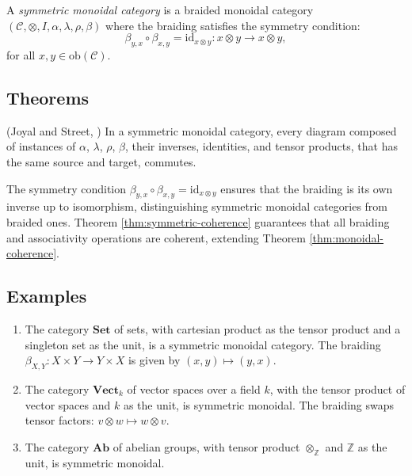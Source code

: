 \documentclass{article}
\begin{document}
\begin{definition}
A \emph{symmetric monoidal category} is a braided monoidal category $(\mathcal{C}, \otimes, I, \alpha, \lambda, \rho, \beta)$ where the braiding satisfies the symmetry condition:
\[
\beta_{y,x} \circ \beta_{x,y} = \mathrm{id}_{x \otimes y} : x \otimes y \to x \otimes y,
\]
for all $x, y \in \mathrm{ob}(\mathcal{C})$.
\end{definition}

\subsection{Theorems}

\begin{theorem}
\label{thm:symmetric-coherence}
(Joyal and Street, \cite{JoyalStreet91}) In a symmetric monoidal category, every diagram composed of instances of $\alpha$, $\lambda$, $\rho$, $\beta$, their inverses, identities, and tensor products, that has the same source and target, commutes.
\end{theorem}

\begin{remark}
The symmetry condition $\beta_{y,x} \circ \beta_{x,y} = \mathrm{id}_{x \otimes y}$ ensures that the braiding is its own inverse up to isomorphism, distinguishing symmetric monoidal categories from braided ones. Theorem \ref{thm:symmetric-coherence} guarantees that all braiding and associativity operations are coherent, extending Theorem \ref{thm:monoidal-coherence}.
\end{remark}

\subsection{Examples}

\begin{enumerate}
    \item The category $\mathbf{Set}$ of sets, with cartesian product as the tensor product and a singleton set as the unit, is a symmetric monoidal category. The braiding $\beta_{X,Y} : X \times Y \to Y \times X$ is given by $(x, y) \mapsto (y, x)$.
    \item The category $\mathbf{Vect}_k$ of vector spaces over a field $k$, with the tensor product of vector spaces and $k$ as the unit, is symmetric monoidal. The braiding swaps tensor factors: $v \otimes w \mapsto w \otimes v$.
    \item The category $\mathbf{Ab}$ of abelian groups, with tensor product $\otimes_{\mathbb{Z}}$ and $\mathbb{Z}$ as the unit, is symmetric monoidal.
\end{enumerate}
\end{document}
